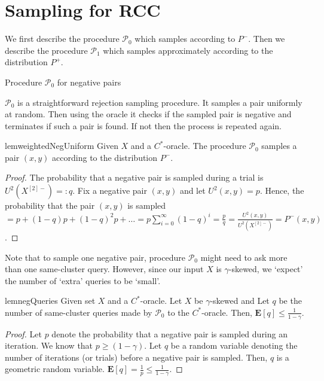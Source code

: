 \documentclass[12pt]{article}
\newcommand{\mb}{\mathbf}
\newcommand{\mc}{\mathcal}
\begin{document}
\section{Sampling for RCC}
\label{section:samplingRCC}
We first describe the procedure $\mc P_0$ which samples according to $P^-$. Then we describe the procedure $\mc P_1$ which samples approximately according to the distribution $P^+$. 

\SetAlgoNoLine
\LinesNumbered
\SetNlSkip{-0.4em}
\begin{algorithm}
\label{alg:weightedNegPairs}
\caption{Procedure $\mc P_0$ for negative pairs}

\Indp{}

\vspace{0.1in} 
\end{algorithm}
$\mc P_0$ is a straightforward rejection sampling procedure. It samples a pair uniformly at random. Then using the oracle it checks if the sampled pair is negative and terminates if such a pair is found. If not then the process is repeated again. 

\begin{restatable}{lem}{weightedNegUniform}
\label{lemma:weightedNegUniform}
Given $X$ and a $C^*$-oracle. The procedure $\mc P_0$ samples a pair $(x, y)$ according to the distribution $P^-$.
\end{restatable}
\begin{proof}
The probability that a negative pair is sampled during a trial is $U^2(X^{[2]-}) =: q$. Fix a negative pair $(x, y)$ and let $U^2(x, y) = p$. Hence, the probability that the pair $(x, y)$ is sampled $= p + (1-q)p + (1-q)^2p + \ldots = p\sum_{i=0}^\infty (1-q)^i = \frac{p}{q} = \frac{U^2(x, y)}{U^2(X^{[2]-})} = P^-(x, y)$.
\end{proof}

\noindent Note that to sample one negative pair, procedure $\mc P_0$ might need to ask more than one same-cluster query. However, since our input $X$ is $\gamma$-skewed, we `expect' the number of `extra' queries to be `small'. 

\begin{restatable}{lem}{negQueries}
\label{lemma:negQueries}Given set $X$ and a $C^*$-oracle. Let $X$ be $\gamma$-skewed and Let $q$ be the number of same-cluster queries made by $\mc P_0$ to the $C^*$-oracle. Then, $\mb E[q] \le \frac{1}{1-\gamma}$.
\end{restatable}
\begin{proof}
Let $p$ denote the probability that a negative pair is sampled during an iteration. We know that $p \ge (1 - \gamma)$. Let $q$ be a random variable denoting the number of iterations (or trials) before a negative pair is sampled. Then, $q$ is a geometric random variable. $\mb E[q] = \frac{1}{p} \le \frac{1}{1-\gamma}$.
\end{proof}
\end{document}
